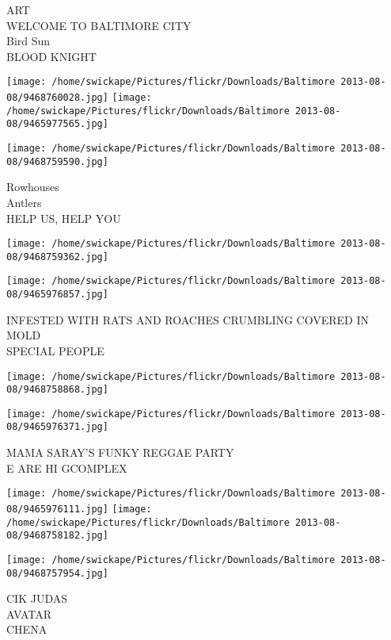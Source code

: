 \documentclass[10pt,letterpaper]{article}
\begin{document}
ART\\
WELCOME TO BALTIMORE CITY\\
Bird Sun\\
BLOOD KNIGHT\\
\pagebreak

\texttt{[image: /home/swickape/Pictures/flickr/Downloads/Baltimore 2013-08-08/9468760028.jpg]}
\texttt{[image: /home/swickape/Pictures/flickr/Downloads/Baltimore 2013-08-08/9465977565.jpg]}

\vspace{0.25in}
\texttt{[image: /home/swickape/Pictures/flickr/Downloads/Baltimore 2013-08-08/9468759590.jpg]}

Rowhouses\\
Antlers\\
HELP US, HELP YOU\\
\pagebreak

\texttt{[image: /home/swickape/Pictures/flickr/Downloads/Baltimore 2013-08-08/9468759362.jpg]}

\vspace{0.25in}
\texttt{[image: /home/swickape/Pictures/flickr/Downloads/Baltimore 2013-08-08/9465976857.jpg]}

INFESTED WITH RATS AND ROACHES CRUMBLING COVERED IN MOLD\\
SPECIAL PEOPLE\\
\pagebreak

\texttt{[image: /home/swickape/Pictures/flickr/Downloads/Baltimore 2013-08-08/9468758868.jpg]}

\vspace{0.25in}
\texttt{[image: /home/swickape/Pictures/flickr/Downloads/Baltimore 2013-08-08/9465976371.jpg]}

MAMA SARAY'S FUNKY REGGAE PARTY\\
E ARE HI GCOMPLEX\\
\pagebreak

\texttt{[image: /home/swickape/Pictures/flickr/Downloads/Baltimore 2013-08-08/9465976111.jpg]}
\texttt{[image: /home/swickape/Pictures/flickr/Downloads/Baltimore 2013-08-08/9468758182.jpg]}

\vspace{0.25in}
\texttt{[image: /home/swickape/Pictures/flickr/Downloads/Baltimore 2013-08-08/9468757954.jpg]}

CIK JUDAS\\
AVATAR\\
CHENA\\
\pagebreak
\end{document}
